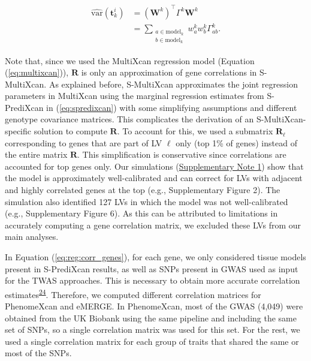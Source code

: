 \documentclass[
  a4paper,
]{article}
\begin{document}
\begin{equation}
\begin{split}
\widehat{\mathrm{var}}(\mathbf{t}_k^i) & = (\mathbf{W}^k)^\top \Gamma^k \mathbf{W}^k \\
        & = \sum_{\substack{a \in \mathrm{model}_k \\ b \in \mathrm{model}_k}} w_a^k w_b^k \Gamma_{ab}^k.
\end{split}
\label{eq:reg:var_gene}\end{equation}

Note that, since we used the MultiXcan regression model (Equation (\ref{eq:multixcan})), \(\mathbf{R}\) is only an approximation of gene correlations in S-MultiXcan.
As explained before, S-MultiXcan approximates the joint regression parameters in MultiXcan using the marginal regression estimates from S-PrediXcan in (\ref{eq:spredixcan}) with some simplifying assumptions and different genotype covariance matrices.
This complicates the derivation of an S-MultiXcan-specific solution to compute \(\mathbf{R}\).
To account for this, we used a submatrix \(\mathbf{R}_{\ell}\) corresponding to genes that are part of LV \(\ell\) only (top 1\% of genes) instead of the entire matrix \(\mathbf{R}\).
This simplification is conservative since correlations are accounted for top genes only.
Our simulations (\protect\hyperlink{sm:reg:null_sim}{Supplementary Note 1}) show that the model is approximately well-calibrated and can correct for LVs with adjacent and highly correlated genes at the top (e.g., Supplementary Figure 2).
The simulation also identified 127 LVs in which the model was not well-calibrated (e.g., Supplementary Figure 6).
As this can be attributed to limitations in accurately computing a gene correlation matrix, we excluded these LVs from our main analyses.

In Equation (\ref{eq:reg:corr_genes}), for each gene, we only considered tissue models present in S-PrediXcan results, as well as SNPs present in GWAS used as input for the TWAS approaches.
This is necessary to obtain more accurate correlation estimates\textsuperscript{\protect\hyperlink{ref-1FFzCXo1s}{24}}.
Therefore, we computed different correlation matrices for PhenomeXcan and eMERGE.
In PhenomeXcan, most of the GWAS (4,049) were obtained from the UK Biobank using the same pipeline and including the same set of SNPs, so a single correlation matrix was used for this set.
For the rest, we used a single correlation matrix for each group of traits that shared the same or most of the SNPs.
\end{document}
